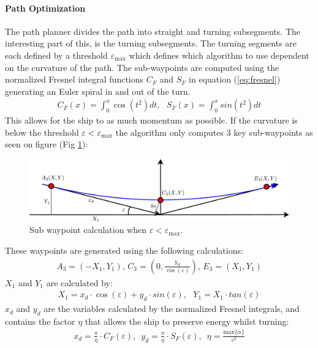 \documentclass[a0,portrait]{a0poster}
\begin{document}
\begin{center}
{\paragraph{Path Optimization}
The path planner divides the path into straight and turning subsegments. The interesting part of this, is the turning subsegments. The turning segments are each defined by a threshold $\varepsilon_\text{max}$ which defines which algorithm to use dependent on the curvature of the path. The sub-waypoints are computed using the normalized Fresnel integral functions $C_F$ and $S_F$ in equation (\ref{eq:fresnel}) generating an Euler spiral in and out of the turn. 
\begin{align}
C_F(x) = \int_0^x \cos(t^2)dt,\,\,\,\,S_F(x) = \int_0^x sin(t^2)dt
\label{eq:fresnel}
\end{align}
This allows for the ship to as much momentum as possible. If the curvature is below the threshold $\varepsilon < \varepsilon_ \text{max}$ the algorithm only computes 3 key sub-waypoints as seen on figure (Fig \ref{fig:3points}):
\begin{figure}[htbp]
	\centering
	\includegraphics[width=0.99\threecolwidth]{img/3points.pdf}
  	\caption{Sub waypoint calculation when $\varepsilon < \varepsilon _\text{max}$.}
	\label{fig:3points}
\end{figure}
These waypoints are generated using the following calculations:
\begin{align}
A_\text{3} = (-X_1,Y_1),\, C_\text{3} = (0,\frac{y_d}{\cos(\varepsilon)}),\, E_\text{3} = (X_1,Y_1)
\end{align}
$X_1$ and $Y_1$ are calculated by:
\begin{align}
X_1 = x_d \cdot \cos(\varepsilon) + y_d \cdot sin(\varepsilon),\,\,\,\, Y_1 = X_1 \cdot tan(\varepsilon)
\end{align}
$x_d$ and $y_d$ are the variables calculated by the normalized Fresnel integrals, and contains the factor $\eta$ that allows the ship to preserve energy whilst turning:
\begin{align}
x_d = \frac{\pi}{\eta}\cdot C_F(\varepsilon),\,\,\, y_d = \frac{\pi}{\eta}\cdot S_F(\varepsilon),\,\,\, \eta = \frac{\text{max}\{\dot{\alpha}\}}{v^2}

\end{align}}
\end{center}
\end{document}
